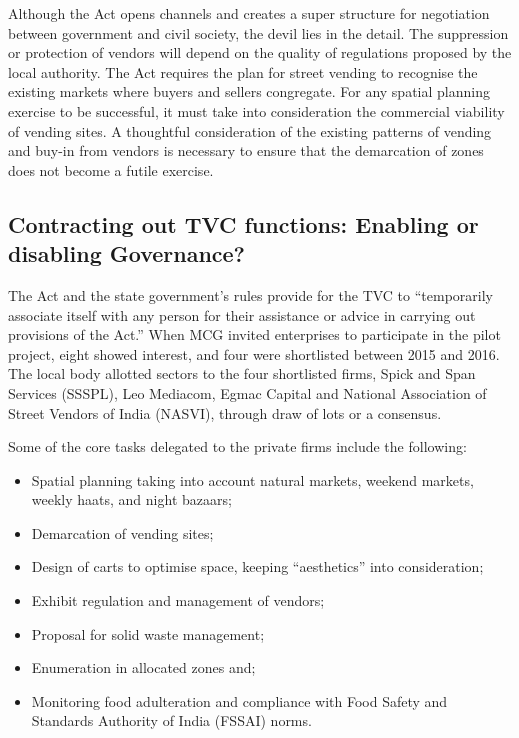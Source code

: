 \documentclass[a4paper, 12pt, twoside]{article}
\begin{document}
{{Although the Act opens channels and creates a super structure for negotiation between government and civil society, the devil lies in the detail. The suppression or protection of vendors will depend on the quality of regulations proposed by the local authority. The Act requires the plan for street vending to recognise the existing markets where buyers and sellers congregate. For any spatial planning exercise to be successful, it must take into consideration the commercial viability of vending sites. A thoughtful consideration of the existing patterns of vending and buy-in from vendors is necessary to ensure that the demarcation of zones does not become a futile exercise.

\subsection*{Contracting out TVC functions: Enabling or disabling Governance?}
The Act and the state government’s rules provide for the TVC to “temporarily associate itself with any person for their assistance or advice in carrying out provisions of the Act.” When MCG invited enterprises to participate in the pilot project, eight showed interest, and four were shortlisted between 2015 and 2016. The local body allotted sectors to the four shortlisted firms,  Spick and Span Services (SSSPL), Leo Mediacom, Egmac Capital and National Association of Street Vendors of India (NASVI), through draw of lots or a consensus.

Some of the core tasks delegated to the private firms include the following:
\begin{itemize}
\item Spatial planning taking into account natural markets, weekend markets, weekly haats, and night bazaars;
\item Demarcation of vending sites;
\item Design of carts to optimise space, keeping “aesthetics” into consideration;
\item Exhibit regulation and management of vendors;
\item Proposal for solid waste management;
\item Enumeration in allocated zones and;
\item Monitoring food adulteration and compliance with Food Safety and Standards Authority of India (FSSAI) norms.
\end{itemize}

}}
\end{document}
